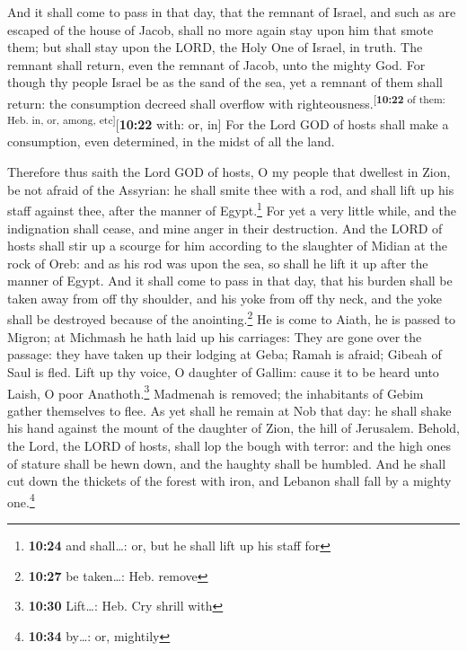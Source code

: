 And it shall come to pass in that day, that the remnant
of Israel, and such as are escaped of the house of Jacob, shall no more
again stay upon him that smote them; but shall stay upon the LORD, the
Holy One of Israel, in truth.  The remnant shall return,
even the remnant of Jacob, unto the mighty God.  For
though thy people Israel be as the sand of the sea, yet a remnant of
them shall return: the consumption decreed shall overflow with
righteousness.\textsuperscript{{[}\textbf{10:22} of them: Heb. in, or,
among, etc{]}}{[}\textbf{10:22} with: or, in{]}  For the
Lord GOD of hosts shall make a consumption, even determined, in the
midst of all the land.

 Therefore thus saith the Lord GOD of hosts, O my people
that dwellest in Zion, be not afraid of the Assyrian: he shall smite
thee with a rod, and shall lift up his staff against thee, after the
manner of Egypt.\footnote{\textbf{10:24} and shall\ldots: or, but he
  shall lift up his staff for}  For yet a very little
while, and the indignation shall cease, and mine anger in their
destruction.  And the LORD of hosts shall stir up a
scourge for him according to the slaughter of Midian at the rock of
Oreb: and as his rod was upon the sea, so shall he lift it up after the
manner of Egypt.  And it shall come to pass in that day,
that his burden shall be taken away from off thy shoulder, and his yoke
from off thy neck, and the yoke shall be destroyed because of the
anointing.\footnote{\textbf{10:27} be taken\ldots: Heb. remove}
 He is come to Aiath, he is passed to Migron; at Michmash
he hath laid up his carriages:  They are gone over the
passage: they have taken up their lodging at Geba; Ramah is afraid;
Gibeah of Saul is fled.  Lift up thy voice, O daughter of
Gallim: cause it to be heard unto Laish, O poor Anathoth.\footnote{\textbf{10:30}
  Lift\ldots: Heb. Cry shrill with}  Madmenah is removed;
the inhabitants of Gebim gather themselves to flee.  As
yet shall he remain at Nob that day: he shall shake his hand against the
mount of the daughter of Zion, the hill of Jerusalem. 
Behold, the Lord, the LORD of hosts, shall lop the bough with terror:
and the high ones of stature shall be hewn down, and the haughty shall
be humbled.  And he shall cut down the thickets of the
forest with iron, and Lebanon shall fall by a mighty one.\footnote{\textbf{10:34}
  by\ldots: or, mightily}


